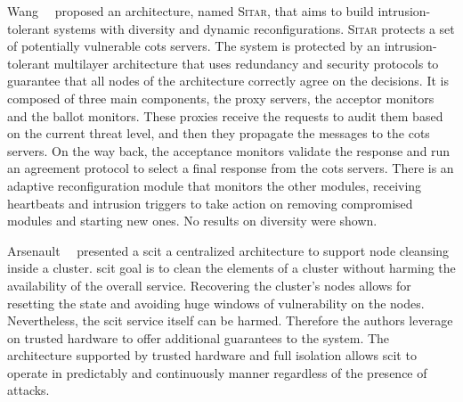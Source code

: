 Wang~\etal{}~\cite{Wang:2003} proposed an architecture, named \textsc{Sitar}, that aims to build intrusion-tolerant systems with diversity and dynamic reconfigurations. 
\textsc{Sitar} protects a set of potentially vulnerable \gls{cots} servers. 
The system is protected by an intrusion-tolerant multilayer architecture that uses redundancy and security protocols to guarantee that all nodes of the architecture correctly agree on the decisions.
It is composed of three main components, the proxy servers, the acceptor monitors and the ballot monitors.
These proxies receive the requests to audit them based on the current threat level, and then they propagate the messages to the \gls{cots} servers. 
On the way back, the acceptance monitors validate the response and run an agreement protocol to select a final response from the \gls{cots} servers.
There is an adaptive reconfiguration module that monitors the other modules, receiving heartbeats and intrusion triggers to take action on removing compromised modules and starting new ones.
No results on diversity were shown.


Arsenault~\etal{}~\cite{Arsenault:2007} presented a \gls{scit} a centralized architecture to support node cleansing inside a cluster.
\gls{scit} goal is to clean the elements of a cluster without harming the availability of the overall service.
Recovering the cluster's nodes allows for resetting the state and avoiding huge windows of vulnerability on the nodes.
Nevertheless, the \gls{scit} service itself can be harmed. Therefore the authors leverage on trusted hardware to offer additional guarantees to the system.
The architecture supported by trusted hardware and full isolation allows \gls{scit} to operate in predictably and continuously manner regardless of the presence of attacks.

